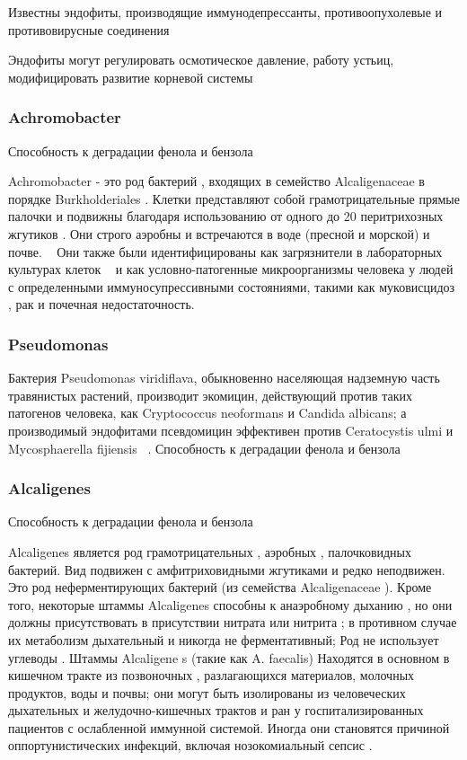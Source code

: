 \documentclass[11pt]{article}
\begin{document}
	Известны эндофиты, производящие иммунодепрессанты, противоопухолевые и противовирусные соединения ~\cite{j.1574-6968.2007.00918.x}
	
	Эндофиты могут регулировать осмотическое давление, работу устьиц, модифицировать развитие корневой системы ~\cite{AEM.71.9.4951-4959.2005}
	 
	\subsubsection{Achromobacter}
	Способность к деградации фенола и бензола ~\cite{09593330.2017.1337232}
	
	Achromobacter - это род бактерий , входящих в семейство Alcaligenaceae в порядке Burkholderiales . Клетки представляют собой грамотрицательные прямые палочки и подвижны благодаря использованию от одного до 20 перитрихозных жгутиков . Они строго аэробны и встречаются в воде (пресной и морской) и почве. ~\cite{Achromobacter_1} Они также были идентифицированы как загрязнители в лабораторных культурах клеток  ~\cite{Achromobacter_2} и как условно-патогенные микроорганизмы человека у людей с определенными иммуносупрессивными состояниями, такими как муковисцидоз , рак и почечная недостаточность. ~\cite{Achromobacter_3}
	 
	\subsubsection{Pseudomonas}
	Бактерия Pseudomonas viridiflava, обыкновенно населяющая надземную часть травянистых растений, производит экомицин, действующий против таких патогенов человека, как Cryptococcus neoformans и Candida albicans; а производимый эндофитами псевдомицин эффективен против Ceratocystis ulmi и Mycosphaerella fijiensis ~\cite{np030397v}. 
	Способность к деградации фенола и бензола ~\cite{09593330.2017.1337232}
	
	\subsubsection{Alcaligenes}
	Способность к деградации фенола и бензола ~\cite{09593330.2017.1337232}
	
	Alcaligenes является род грамотрицательных , аэробных , палочковидных бактерий. Вид подвижен с амфитриховидными жгутиками и редко неподвижен. Это род неферментирующих бактерий (из семейства Alcaligenaceae ). Кроме того, некоторые штаммы Alcaligenes способны к анаэробному дыханию , но они должны присутствовать в присутствии нитрата или нитрита ; в противном случае их метаболизм дыхательный и никогда не ферментативный; Род не использует углеводы . Штаммы Alcaligene s (такие как A. faecalis) Находятся в основном в кишечном тракте из позвоночных , разлагающихся материалов, молочных продуктов, воды и почвы; они могут быть изолированы из человеческих дыхательных и желудочно-кишечных трактов и ран у госпитализированных пациентов с ослабленной иммунной системой. Иногда они становятся причиной оппортунистических инфекций, включая нозокомиальный сепсис . ~\cite{Alcaligenes_1, Alcaligenes_2}
	
\end{document}
